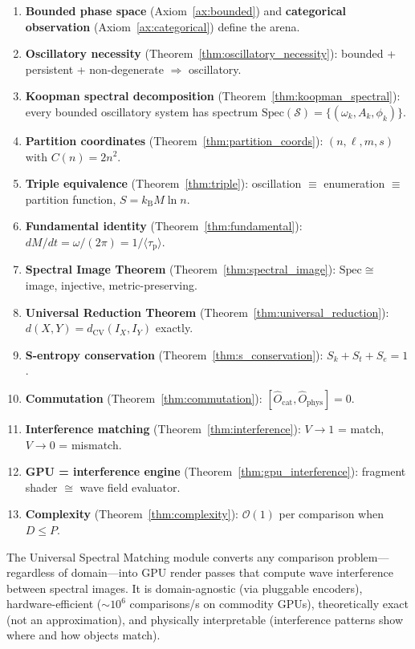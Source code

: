 \documentclass[11pt,twocolumn,a4paper]{article}
\newcommand{\kb}{k_{\mathrm{B}}}
\newcommand{\Ocat}{\hat{O}_{\mathrm{cat}}}
\newcommand{\Ophys}{\hat{O}_{\mathrm{phys}}}
\newcommand{\Sk}{S_k}
\newcommand{\St}{S_t}
\newcommand{\Se}{S_e}
\newcommand{\BigO}{\mathcal{O}}
\newcommand{\taup}{\tau_{\mathrm{p}}}
\newcommand{\Spec}{\mathrm{Spec}}
\begin{document}
\begin{enumerate}[nosep]
  \item \textbf{Bounded phase space} (Axiom~\ref{ax:bounded}) and
    \textbf{categorical observation} (Axiom~\ref{ax:categorical})
    define the arena.
  \item \textbf{Oscillatory necessity}
    (Theorem~\ref{thm:oscillatory_necessity}): bounded + persistent
    + non-degenerate $\Rightarrow$ oscillatory.
  \item \textbf{Koopman spectral decomposition}
    (Theorem~\ref{thm:koopman_spectral}): every bounded oscillatory
    system has spectrum
    $\Spec(\mathcal{S}) = \{(\omega_k, A_k, \phi_k)\}$.
  \item \textbf{Partition coordinates}
    (Theorem~\ref{thm:partition_coords}): $(n, \ell, m, s)$ with
    $C(n) = 2n^2$.
  \item \textbf{Triple equivalence} (Theorem~\ref{thm:triple}):
    oscillation $\equiv$ enumeration $\equiv$ partition function,
    $S = \kb M \ln n$.
  \item \textbf{Fundamental identity} (Theorem~\ref{thm:fundamental}):
    $dM/dt = \omega/(2\pi) = 1/\langle\taup\rangle$.
  \item \textbf{Spectral Image Theorem} (Theorem~\ref{thm:spectral_image}):
    $\Spec \cong$ image, injective, metric-preserving.
  \item \textbf{Universal Reduction Theorem}
    (Theorem~\ref{thm:universal_reduction}):
    $d(X,Y) = d_{\mathrm{CV}}(I_X, I_Y)$ exactly.
  \item \textbf{S-entropy conservation}
    (Theorem~\ref{thm:s_conservation}): $\Sk + \St + \Se = 1$.
  \item \textbf{Commutation} (Theorem~\ref{thm:commutation}):
    $[\Ocat, \Ophys] = 0$.
  \item \textbf{Interference matching}
    (Theorem~\ref{thm:interference}): $V \to 1$ = match,
    $V \to 0$ = mismatch.
  \item \textbf{GPU = interference engine}
    (Theorem~\ref{thm:gpu_interference}): fragment shader $\cong$
    wave field evaluator.
  \item \textbf{Complexity} (Theorem~\ref{thm:complexity}):
    $\BigO(1)$ per comparison when $D \leq P$.
\end{enumerate}

The Universal Spectral Matching module converts any comparison
problem---regardless of domain---into GPU render passes that compute
wave interference between spectral images. It is domain-agnostic (via
pluggable encoders), hardware-efficient ($\sim 10^6$ comparisons/s on
commodity GPUs), theoretically exact (not an approximation), and
physically interpretable (interference patterns show where and how
objects match).
\end{document}
